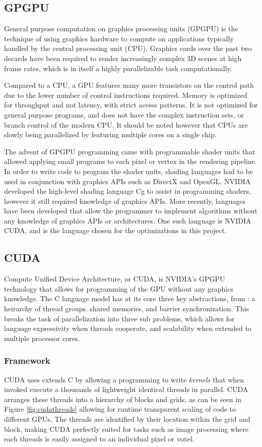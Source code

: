 	\subsection{GPGPU}
General purpose computation on graphics processing units (GPGPU) is the technique of using graphics hardware to compute on applications typically handled by the central processing unit (CPU). Graphics cards over the past two decards have been required to render increasingly complex 3D scenes at high frame rates, which is in itself a highly parallelizable task computationally. 

Compared to a CPU, a GPU features many more transistors on the control path due to the lower number of control instructions required. Memory is optimized for throughput and not latency, with strict access patterns. It is not optimized for general purpose programs, and does not have the complex instruction sets, or branch control of the modern CPU. It should be noted however that CPUs are slowly being parallelized by featuring multiple cores on a single chip.

The advent of GPGPU programming came with programmable shader units that allowed applying small programs to each pixel or vertex in the rendering pipeline. In order to write code to program the shader units, shading languages had to be used in conjunction with graphics APIs such as DirectX and OpenGL. NVIDIA developed the high-level shading language Cg to assist in programming shaders, however it still required knowledge of graphics APIs. More recently, languages have been developed that allow the programmer to implement algorithms without any knowledge of graphics APIs or architectures. One such language is NVIDIA CUDA, and is the language chosen for the optimizations in this project.

	\subsection{CUDA}
Compute Unified Device Architecture, or CUDA, is NVIDIA's GPGPU technology that allows for programming of the GPU without any graphics knowledge. The C language model has at its core three key abstractions, from \cite{cuda}: a heirarchy of thread groups. shared memories, and barrier synchronization. This breaks the task of parallelization into three sub problems, which allows for language expressivity when threads cooperate, and scalability when extended to multiple processor cores.

		\subsubsection{Framework}
CUDA uses extends C by allowing a programming to write \textit{kernels} that when invoked execute a thousands of lightweight identical threads in parallel. CUDA arranges these threads into a hierarchy of blocks and grids, as can be seen in Figure \ref{fig:cudathreads} allowing for runtime transparent scaling of code to different GPUs. The threads are identified by their location within the grid and block, making CUDA perfectly suited for tasks such as image processing where each threads is easily assigned to an individual pixel or voxel.

